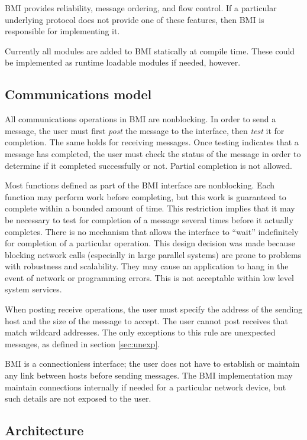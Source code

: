 \documentclass[11pt]{article}
\begin{document}
BMI provides reliability, message ordering, and flow control.  If a
particular underlying protocol does not provide one of these features,
then BMI is responsible for implementing it.

Currently all modules are added to BMI statically at compile time.
These could be implemented as runtime loadable modules if
needed, however.

\subsection{Communications model}

All communications operations in BMI are nonblocking.  In order to send a
message, the user must first \emph{post} the message to the interface,
then \emph{test} it for completion.  The same holds for receiving
messages.  Once testing indicates that a message has completed, the
user must check the status of the message in order to determine if it
completed successfully or not.  Partial completion is not allowed.

Most functions defined as part of the BMI interface are nonblocking.
Each function may perform work before completing, but this work is
guaranteed to complete within a bounded amount of time.  This restriction
implies that it may be necessary to test for completion of a message
several times before it actually completes.  There is no mechanism
that allows the interface to ``wait'' indefinitely for completion of
a particular operation.  This design decision was made because blocking
network calls (especially in large parallel systems) are prone to problems
with robustness and scalability.  They may cause an application to hang
in the event of network or programming errors.  This is not acceptable
within low level system services.

When posting receive operations, the user must specify the address of
the sending host and the size of the message to accept.  The user cannot
post receives that match wildcard addresses.  The only exceptions to
this rule are unexpected messages, as defined in section
\ref{sec:unexp}.

BMI is a connectionless interface; the user does not have to establish
or maintain any link between hosts before sending messages.  The BMI
implementation may maintain connections internally if needed for a
particular network device, but such details are not exposed to the user.

\subsection{Architecture}
\label{sec:arch}
\end{document}
